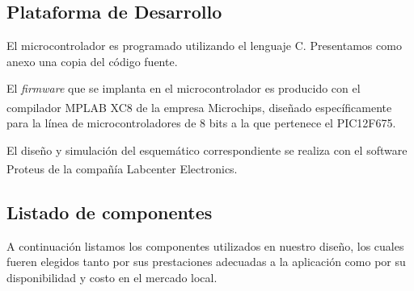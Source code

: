 \documentclass[a4paper]{article}
\let\originalcite\cite
\renewcommand{\cite}[2][]{\textsuperscript{\originalcite{#2}}}
\begin{document}
\subsection{Plataforma de Desarrollo}

El microcontrolador es programado utilizando el lenguaje C. 
Presentamos como anexo una copia del código fuente.

El \textit{firmware} que se implanta en el microcontrolador es  
producido con el compilador MPLAB XC8\cite{bib:compilador} de la 
empresa Microchips, diseñado específicamente para la línea de 
microcontroladores de 8 bits a la que pertenece el PIC12F675.

El diseño y simulación del esquemático correspondiente se realiza 
con el software Proteus\cite{bib:simulador} de la compañía 
Labcenter Electronics.

\subsection{Listado de componentes}

A continuación listamos los componentes utilizados en nuestro diseño,
los cuales fueren elegidos tanto por sus prestaciones adecuadas a la 
aplicación como por su disponibilidad y costo en el mercado local.
\end{document}
